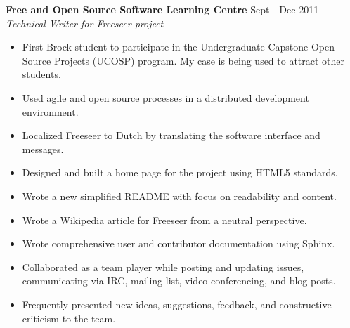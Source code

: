 \documentclass[margin]{res}
\begin{document}
\begin{resume}
	\textbf{Free and Open Source Software Learning Centre} \hfill Sept - Dec 2011 \\
    {\sl Technical Writer for Freeseer project} \hfill %
	\begin{itemize}  \itemsep -2pt %
	  \item First Brock student to participate in the Undergraduate Capstone Open Source Projects
	  (UCOSP) program. My case is being used to attract other students.
	  \item Used agile and open source processes in a distributed development environment.
	  \item Localized Freeseer to Dutch by translating the software interface and messages.
	  \item Designed and built a home page for the project using HTML5 standards.
    \item Wrote a new simplified README with focus on readability and content.
	  \item Wrote a Wikipedia article for Freeseer from a neutral perspective.
	  \item Wrote comprehensive user and contributor documentation using Sphinx.
	  \item Collaborated as a team player while posting and updating issues,
	  communicating via IRC, mailing list, video conferencing, and blog posts.
	  \item Frequently presented new ideas, suggestions, feedback, and constructive criticism to the team.
	\end{itemize}


\end{resume}
\end{document}
